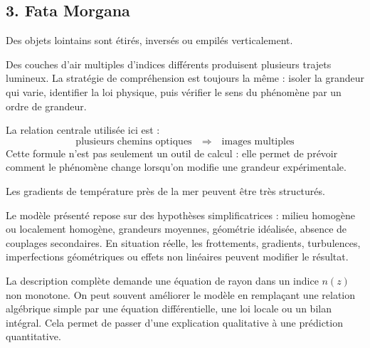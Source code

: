 \documentclass[11pt,a4paper]{article}
\begin{document}
\subsection{3. Fata Morgana}

\begin{exemplebox}
Des objets lointains sont étirés, inversés ou empilés verticalement.
\end{exemplebox}

\begin{methodebox}
Des couches d'air multiples d'indices différents produisent plusieurs trajets lumineux.
La stratégie de compréhension est toujours la même : isoler la grandeur qui varie, identifier la loi physique, puis vérifier le sens du phénomène par un ordre de grandeur.
\end{methodebox}

\begin{theorembox}
La relation centrale utilisée ici est :
\[
\text{plusieurs chemins optiques}\quad\Rightarrow\quad \text{images multiples}
\]
Cette formule n'est pas seulement un outil de calcul : elle permet de prévoir comment le phénomène change lorsqu'on modifie une grandeur expérimentale.
\end{theorembox}

\begin{odgbox}
Les gradients de température près de la mer peuvent être très structurés.
\end{odgbox}

\begin{attentionbox}
Le modèle présenté repose sur des hypothèses simplificatrices : milieu homogène ou localement homogène, grandeurs moyennes, géométrie idéalisée, absence de couplages secondaires. En situation réelle, les frottements, gradients, turbulences, imperfections géométriques ou effets non linéaires peuvent modifier le résultat.
\end{attentionbox}

\begin{approfondissementbox}
La description complète demande une équation de rayon dans un indice $n(z)$ non monotone.
On peut souvent améliorer le modèle en remplaçant une relation algébrique simple par une équation différentielle, une loi locale ou un bilan intégral. Cela permet de passer d'une explication qualitative à une prédiction quantitative.
\end{approfondissementbox}
\end{document}
